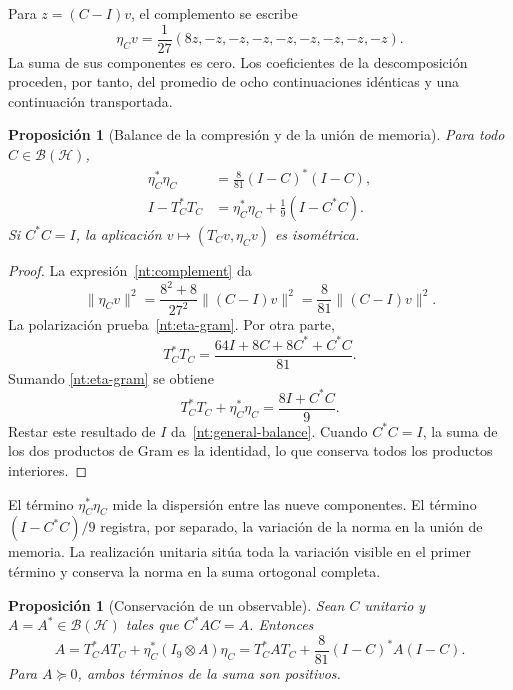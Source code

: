 \documentclass[a4paper,10pt]{article}
\newtheorem{proposition}[theorem]{Proposición}
\theoremstyle{definition}\newtheorem{definition}[theorem]{Definición}
\theoremstyle{remark}\newtheorem{remark}[theorem]{Observación}
\numberwithin{equation}{section}
\begin{document}
Para \(z=(C-I)v\), el complemento se escribe
\begin{equation}
 \eta_Cv=\frac1{27}(8z,-z,-z,-z,-z,-z,-z,-z,-z).
 \label{nt:complement}
\end{equation}
La suma de sus componentes es cero. Los coeficientes de la
descomposición proceden, por tanto, del promedio de ocho
continuaciones idénticas y una continuación transportada.

\begin{proposition}[Balance de la compresión y de la unión de memoria]
Para todo \(C\in\mathcal B(\mathcal H)\),
\begin{align}
 \eta_C^*\eta_C
   &=\frac8{81}(I-C)^*(I-C),\label{nt:eta-gram}\\
 I-T_C^*T_C
   &=\eta_C^*\eta_C+\frac19(I-C^*C).\label{nt:general-balance}
\end{align}
Si \(C^*C=I\), la aplicación
\(v\mapsto(T_Cv,\eta_Cv)\) es isométrica.
\end{proposition}

\begin{proof}
La expresión~\eqref{nt:complement} da
\[
 \|\eta_Cv\|^2
 =\frac{8^2+8}{27^2}\|(C-I)v\|^2
 =\frac8{81}\|(C-I)v\|^2.
\]
La polarización prueba~\eqref{nt:eta-gram}. Por otra parte,
\[
 T_C^*T_C
 =\frac{64I+8C+8C^*+C^*C}{81}.
\]
Sumando \eqref{nt:eta-gram} se obtiene
\[
 T_C^*T_C+\eta_C^*\eta_C=\frac{8I+C^*C}{9}.
\]
Restar este resultado de \(I\) da~\eqref{nt:general-balance}.
Cuando \(C^*C=I\), la suma de los dos productos de Gram es la
identidad, lo que conserva todos los productos interiores.
\end{proof}

El término \(\eta_C^*\eta_C\) mide la dispersión entre las nueve
componentes. El término \((I-C^*C)/9\) registra, por separado,
la variación de la norma en la unión de memoria. La realización
unitaria sitúa toda la variación visible en el primer término y
conserva la norma en la suma ortogonal completa.

\begin{proposition}[Conservación de un observable]
Sean \(C\) unitario y \(A=A^*\in\mathcal B(\mathcal H)\) tales que
\(C^*AC=A\). Entonces
\begin{equation}
 A=T_C^*AT_C+
   \eta_C^*(I_9\otimes A)\eta_C
  =T_C^*AT_C+\frac8{81}(I-C)^*A(I-C).
 \label{nt:observable-balance}
\end{equation}
Para \(A\succeq0\), ambos términos de la suma son positivos.
\end{proposition}
\end{document}
